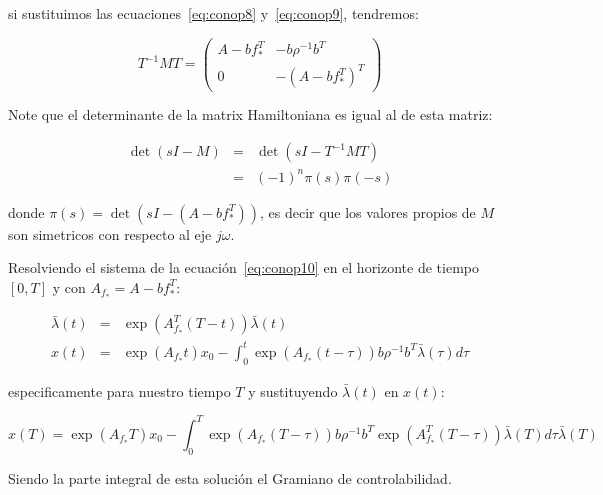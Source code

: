             si sustituimos las ecuaciones~\ref{eq:conop8} y~\ref{eq:conop9}, tendremos:

            \begin{equation*}
                T^{-1} M T =
                \begin{pmatrix}
                    A - b f_*^T & - b \rho^{-1} b^T \\
                    0 & -(A - b f_*^T)^T
                \end{pmatrix}
            \end{equation*}

            \begin{nota}
                Note que el determinante de la matrix Hamiltoniana es igual al de esta matriz:

                \begin{eqnarray*}
                    \det{(sI - M)} & = & \det{(sI - T^{-1}MT)} \\
                     & = & (-1)^n \pi(s) \pi(-s)
                \end{eqnarray*}

                donde $\pi(s) = \det{(sI - (A - b f_*^T))}$, es decir que los valores propios de $M$ son simetricos con respecto al eje $j\omega$.
            \end{nota}

            Resolviendo el sistema de la ecuación~\ref{eq:conop10} en el horizonte de tiempo $[0, T]$ y con $A_{f_*} = A - b f_*^T$:

            \begin{eqnarray}
                \bar{\lambda}(t) & = & \exp{(A_{f_*}^T (T - t))} \bar{\lambda}(t) \\
                x(t) & = & \exp{(A_{f_*} t)} x_0 - \int_0^t \exp{(A_{f_*}(t - \tau))} b \rho^{-1} b^T \bar{\lambda}(\tau) d\tau \nonumber
            \end{eqnarray}

            especificamente para nuestro tiempo $T$ y sustituyendo $\bar{\lambda}(t)$ en $x(t)$:

            \begin{equation*}
                x(T) = \exp{(A_{f_*} T)} x_0 - \int_0^T \exp{(A_{f_*}(T - \tau))} b \rho^{-1} b^T \exp{(A_{f_*}^T (T - \tau))} \bar{\lambda}(T) d\tau \bar{\lambda}(T)
            \end{equation*}

            Siendo la parte integral de esta solución el Gramiano de controlabilidad.

